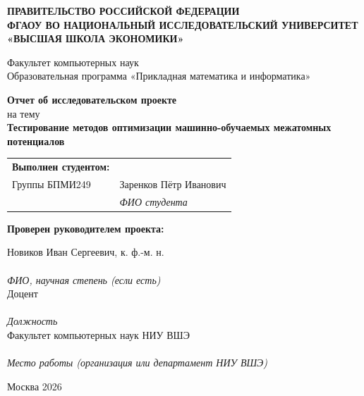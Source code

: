 \begin{titlepage}
\thispagestyle{empty}

\begin{center}
\textbf{ПРАВИТЕЛЬСТВО РОССИЙСКОЙ ФЕДЕРАЦИИ}\\
\textbf{ФГАОУ ВО НАЦИОНАЛЬНЫЙ ИССЛЕДОВАТЕЛЬСКИЙ УНИВЕРСИТЕТ}\\
\textbf{«ВЫСШАЯ ШКОЛА ЭКОНОМИКИ»}
\end{center}

\vspace{0.8cm}

\begin{center}
Факультет компьютерных наук\\
Образовательная программа «Прикладная математика и информатика»
\end{center}

\vfill

\begin{center}
\textbf{Отчет об исследовательском проекте}\\
на тему\\
\textbf{Тестирование методов оптимизации машинно-обучаемых межатомных потенциалов}
\end{center}

\vfill

\noindent
\begin{tabularx}{\textwidth}{@{}lX@{}}
\textbf{Выполнен студентом:} & \\
Группы БПМИ249 & Заренков Пётр Иванович\\
 & \textit{ФИО студента}
\end{tabularx}

\vspace{0.8cm}

\noindent
\textbf{Проверен руководителем проекта:}\\
\begin{center}
Новиков Иван Сергеевич, к. ф.-м. н.\\[-0.2cm]
\makebox[\textwidth]{\hrulefill}\\
\textit{ФИО, научная степень (если есть)}\\[0.6cm]
Доцент\\[-0.2cm]
\makebox[\textwidth]{\hrulefill}\\
\textit{Должность}\\[0.6cm]
Факультет компьютерных наук НИУ ВШЭ\\[-0.2cm]
\makebox[\textwidth]{\hrulefill}\\
\textit{Место работы (организация или департамент НИУ ВШЭ)}
\end{center}

\vfill

\begin{center}
Москва 2026
\end{center}

\end{titlepage}
